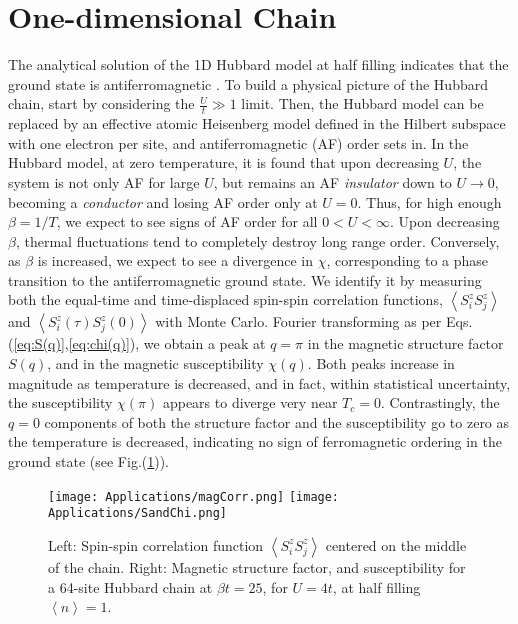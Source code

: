 \section{One-dimensional Chain}
\label{sec:1d-chain}

The analytical solution of the \acs{1D} Hubbard model at half filling indicates that the ground state is antiferromagnetic \cite{lieb_absence_1968}.
To build a physical picture of the Hubbard chain, start by considering the $\frac{U}{t} \gg 1$ limit. 
Then, the Hubbard model can be replaced by an effective atomic Heisenberg model defined in the Hilbert subspace with one electron per site, and antiferromagnetic (AF) order sets in.
In the Hubbard model, at zero temperature, it is found that upon decreasing $U$, the system is not only \acs{AF} for large $U$, but remains an \acs{AF} \emph{insulator} down to $U \rightarrow 0$, becoming a \emph{conductor} and losing \acs{AF} order only at $U = 0$.
Thus, for high enough $\beta = 1 / T$, we expect to see signs of \acs{AF} order for all $0 < U < \infty$.
Upon decreasing $\beta$, thermal fluctuations tend to completely destroy long range order.
Conversely, as $\beta$ is increased, we expect to see a divergence in $\chi$, corresponding to a phase transition to the antiferromagnetic ground state.
We identify it by measuring both the equal-time and time-displaced spin-spin correlation functions, $\left\langle S^z_i  S^z_j \right\rangle$ and $\left\langle S^z_i (\tau) S^z_j (0) \right\rangle$ with Monte Carlo.
Fourier transforming as per Eqs.(\ref{eq:S(q)},\ref{eq:chi(q)}), we obtain a peak at $q = \pi$ in the magnetic structure factor $S ( q ) $, and in the magnetic susceptibility $\chi (q)$.
Both peaks increase in magnitude as temperature is decreased, and in fact, within statistical uncertainty, the  susceptibility $\chi (\pi)$ appears to diverge very near $T_c = 0$.
Contrastingly, the $q = 0$ components of both the structure factor and the susceptibility go to zero as the temperature is decreased, indicating  no sign of ferromagnetic ordering in the ground state (see Fig.(\ref{fig:corr_FT})).
\begin{figure}[H]
\hspace{0.2cm}
\texttt{[image: Applications/magCorr.png]}
\hspace{0.7cm}
\texttt{[image: Applications/SandChi.png]}
\caption[Spin-spin correlation function, magnetic structure factor, and susceptibility for a 64 site Hubbard chain at $\beta t = 25 $, for $U = 4t$.]{Left: Spin-spin correlation function $\left\langle S^z_i S^z_j \right\rangle$ centered on the middle of the chain.
Right: Magnetic structure factor, and susceptibility for a 64-site Hubbard chain at $\beta t = 25 $, for $U = 4t$, at half filling $\left\langle n \right\rangle = 1$.\label{fig:corr_FT}}
\end{figure}
